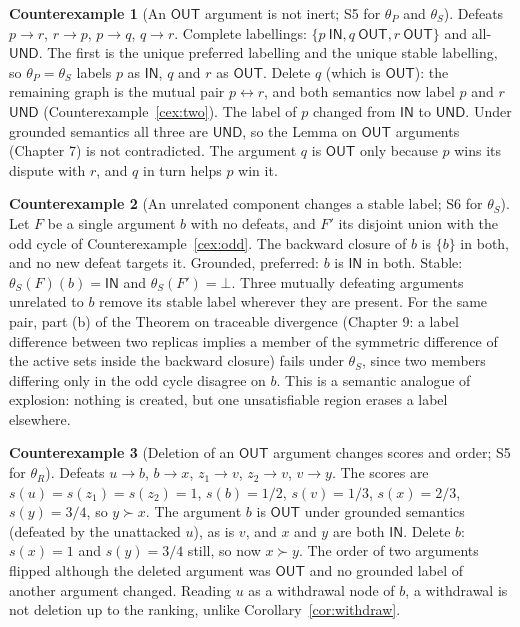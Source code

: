 \documentclass[11pt]{article}
\theoremstyle{plain}
\theoremstyle{definition}
\newtheorem{counterexample}{Counterexample}
\theoremstyle{remark}
\newcommand{\IN}{\textsf{IN}}
\newcommand{\OUT}{\textsf{OUT}}
\newcommand{\UND}{\textsf{UND}}
\begin{document}
\begin{counterexample}[An $\OUT$ argument is not inert; S5 for $\theta_P$ and $\theta_S$]\label{cex:outinert}
Defeats $p\to r$, $r\to p$, $p\to q$, $q\to r$. Complete labellings: $\{p\ \IN,q\ \OUT,r\ \OUT\}$ and all-$\UND$. The first is the unique preferred labelling and the unique stable labelling, so $\theta_P=\theta_S$ labels $p$ as $\IN$, $q$ and $r$ as $\OUT$. Delete $q$ (which is $\OUT$): the remaining graph is the mutual pair $p\leftrightarrow r$, and both semantics now label $p$ and $r$ $\UND$ (Counterexample~\ref{cex:two}). The label of $p$ changed from $\IN$ to $\UND$. Under grounded semantics all three are $\UND$, so the Lemma on $\OUT$ arguments (Chapter 7) is not contradicted. The argument $q$ is $\OUT$ only because $p$ wins its dispute with $r$, and $q$ in turn helps $p$ win it.
\end{counterexample}

\begin{counterexample}[An unrelated component changes a stable label; S6 for $\theta_S$]\label{cex:dirstable}
Let $F$ be a single argument $b$ with no defeats, and $F'$ its disjoint union with the odd cycle of Counterexample~\ref{cex:odd}. The backward closure of $b$ is $\{b\}$ in both, and no new defeat targets it. Grounded, preferred: $b$ is $\IN$ in both. Stable: $\theta_S(F)(b)=\IN$ and $\theta_S(F')=\bot$. Three mutually defeating arguments unrelated to $b$ remove its stable label wherever they are present. For the same pair, part (b) of the Theorem on traceable divergence (Chapter 9: a label difference between two replicas implies a member of the symmetric difference of the active sets inside the backward closure) fails under $\theta_S$, since two members differing only in the odd cycle disagree on $b$. This is a semantic analogue of explosion: nothing is created, but one unsatisfiable region erases a label elsewhere.
\end{counterexample}

\begin{counterexample}[Deletion of an $\OUT$ argument changes scores and order; S5 for $\theta_R$]\label{cex:rankout}
Defeats $u\to b$, $b\to x$, $z_1\to v$, $z_2\to v$, $v\to y$. The scores are $s(u)=s(z_1)=s(z_2)=1$, $s(b)=1/2$, $s(v)=1/3$, $s(x)=2/3$, $s(y)=3/4$, so $y\succ x$. The argument $b$ is $\OUT$ under grounded semantics (defeated by the unattacked $u$), as is $v$, and $x$ and $y$ are both $\IN$. Delete $b$: $s(x)=1$ and $s(y)=3/4$ still, so now $x\succ y$. The order of two arguments flipped although the deleted argument was $\OUT$ and no grounded label of another argument changed. Reading $u$ as a withdrawal node of $b$, a withdrawal is not deletion up to the ranking, unlike Corollary~\ref{cor:withdraw}.
\end{counterexample}
\end{document}
